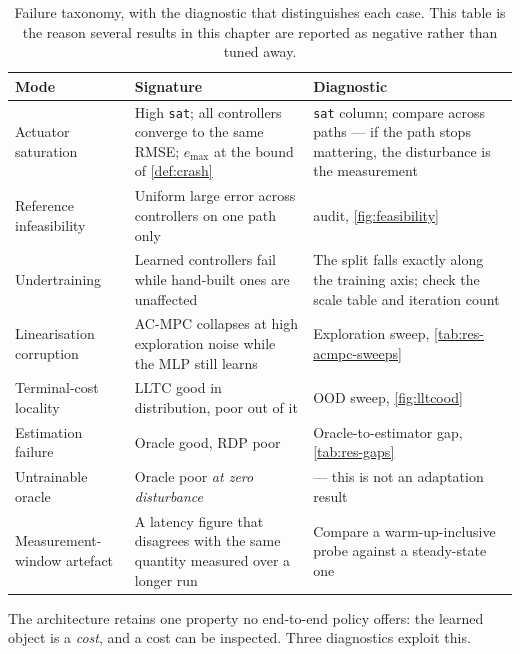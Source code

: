 \documentclass[11pt,a4paper,twoside,openright]{report}
\makeatletter
\renewcommand{\subsection}{\FloatBarrier\old@subsection}}
\DeclareRobustCommand{\ACMPC}{AC\nbd MPC}
\DeclareRobustCommand{\LLTC}{LLTC}
\theoremstyle{plain}
\theoremstyle{definition}
\theoremstyle{remark}
\DeclareRobustCommand{\nbd}{\mbox{-}}
\makeatother
\begin{document}
	\begin{table}[htbp]
		\centering
		\caption{Failure taxonomy, with the diagnostic that distinguishes each case.
			This table is the reason several results in this chapter are reported as
			negative rather than tuned away.}
		\label{tab:failures}
		\small
		\begin{tabularx}{\linewidth}{@{}l X X@{}}
			\toprule
			\textbf{Mode} & \textbf{Signature} & \textbf{Diagnostic} \\
			\midrule
			Actuator saturation & High \texttt{sat}; all controllers converge to the same RMSE; $e_{\max}$ at the bound of \cref{def:crash} & \texttt{sat} column; compare across paths --- if the path stops mattering, the disturbance is the measurement \\
			Reference infeasibility & Uniform large error across controllers on one path only & \Cref{eq:omegacap} audit, \cref{fig:feasibility} \\
			Undertraining & Learned controllers fail while hand-built ones are unaffected & The split falls exactly along the training axis; check the scale table and iteration count \\
			Linearisation corruption & \ACMPC{} collapses at high exploration noise while the MLP still learns & Exploration sweep, \cref{tab:res-acmpc-sweeps} \\
			Terminal-cost locality & \LLTC{} good in distribution, poor out of it & OOD sweep, \cref{fig:lltcood} \\
			Estimation failure & Oracle good, RDP poor & Oracle-to-estimator gap, \cref{tab:res-gaps} \\
			Untrainable oracle & Oracle poor \emph{at zero disturbance} & \Cref{tab:res-trainhealth} --- this is not an adaptation result \\
			Measurement-window artefact & A latency figure that disagrees with the same quantity measured over a longer run & Compare a warm-up-inclusive probe against a steady-state one \\
			\bottomrule
		\end{tabularx}
	\end{table}

	\subsection{Interpretability}

	The architecture retains one property no end-to-end policy offers: the learned
	object is a \emph{cost}, and a cost can be inspected. Three diagnostics exploit
	this.
\end{document}
